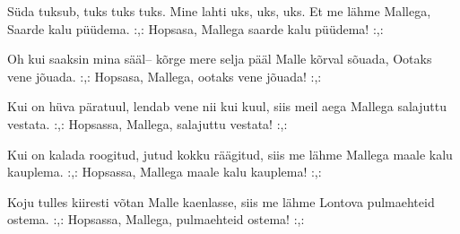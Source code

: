 S\"uda tuksub, tuks tuks tuks.
Mine lahti uks, uks, uks.
Et me l\"ahme Mallega,
Saarde kalu p\"u\"udema.
:,: Hopsasa, Mallega
saarde kalu p\"u\"udema! :,:

Oh kui saaksin mina s\"a\"al--
k\~orge mere selja p\"a\"al
Malle k\~orval s\~ouada,
Ootaks vene j\~ouada.
:,: Hopsasa, Mallega,
ootaks vene j\~ouada! :,:

Kui on h\"uva p\"aratuul,
lendab vene nii kui kuul,
siis meil aega Mallega
salajuttu vestata.
:,: Hopsassa, Mallega,
salajuttu vestata! :,:

Kui on kalada roogitud,
jutud kokku r\"a\"agitud,
siis me l\"ahme Mallega
maale kalu kauplema.
:,: Hopsassa, Mallega
maale kalu kauplema! :,:

Koju tulles kiiresti
v\~otan Malle kaenlasse,
siis me l\"ahme Lontova
pulmaehteid ostema.
:,: Hopsassa, Mallega,
pulmaehteid ostema! :,: